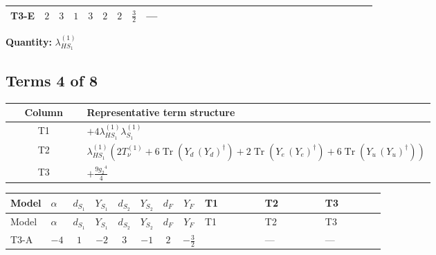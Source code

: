 \documentclass[8pt]{article}
\begin{document}
\begin{landscape}
\begin{longtable}{@{}llcccccc >{\raggedright\arraybackslash}p{0.21\linewidth} >{\raggedright\arraybackslash}p{0.21\linewidth} >{\raggedright\arraybackslash}p{0.21\linewidth}@{}}
\midrule
T3-E & $2$ & $3$ & $1$ & $3$ & $2$ & $2$ & $\frac{3}{2}$ & --- & \scriptsize\adjustbox{max width=\linewidth}{$\begin{gathered} +6 {\lambda_1} {\lambda_{HS_1}^{(1)}}\end{gathered}$} & \scriptsize\adjustbox{max width=\linewidth}{$\begin{gathered} +4 {\lambda_{HS_1}^{(1)}}^2\end{gathered}$} \\
\midrule
\bottomrule
\end{longtable}
\clearpage
\noindent\textbf{Quantity: }$\lambda_{HS_1}^{(1)}$\par\smallskip
\subsection*{Terms 4 of 8}
\begin{center}
\begin{tabular}{@{}c >{\raggedright\arraybackslash}p{0.82\linewidth}@{}}
\toprule
Column & Representative term structure \\
\midrule
T1 & \(\displaystyle +4 {\lambda_{HS_1}^{(1)}} {\lambda_{S_1}^{(1)}}\) \\
\midrule
T2 & \(\displaystyle {\lambda_{HS_1}^{(1)}} (2 T_{\nu}^{(1)}+6 \operatorname{Tr}\!\left({Y_d}\,\left({Y_d}\right)^{\dagger}\right)+2 \operatorname{Tr}\!\left({Y_e}\,\left({Y_e}\right)^{\dagger}\right)+6 \operatorname{Tr}\!\left({Y_u}\,\left({Y_u}\right)^{\dagger}\right))\) \\
\midrule
T3 & \(\displaystyle +\frac{9 {g_2}^4}{4}\) \\
\midrule
\bottomrule
\end{tabular}
\end{center}
\smallskip
\tiny
\begin{longtable}{@{}llcccccc >{\raggedright\arraybackslash}p{0.21\linewidth} >{\raggedright\arraybackslash}p{0.21\linewidth} >{\raggedright\arraybackslash}p{0.21\linewidth}@{}}
\toprule
Model & $\alpha$ & $d_{S_1}$ & $Y_{S_1}$ & $d_{S_2}$ & $Y_{S_2}$ & $d_F$ & $Y_F$ & T1 & T2 & T3 \\
\midrule
\endfirsthead
\toprule
Model & $\alpha$ & $d_{S_1}$ & $Y_{S_1}$ & $d_{S_2}$ & $Y_{S_2}$ & $d_F$ & $Y_F$ & T1 & T2 & T3 \\
\midrule
\endhead
T3-A & $-4$ & $1$ & $-2$ & $3$ & $-1$ & $2$ & $-\frac{3}{2}$ & \scriptsize\adjustbox{max width=\linewidth}{$\begin{gathered} +4 {\lambda_{HS_1}^{(1)}} {\lambda_{S_1}^{(1)}}\end{gathered}$} & --- & --- \\

\end{longtable}
\end{landscape}
\end{document}
